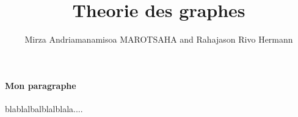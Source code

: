 \documentclass[12pt,a4paper,oneside,twocolumn]{report}
\author{Mirza Andriamanamisoa MAROTSAHA and Rahajason Rivo Hermann}
\title{Theorie des graphes }
\begin{document}
\paragraph{Mon paragraphe}
blablalbalblalblala....
\end{document}
